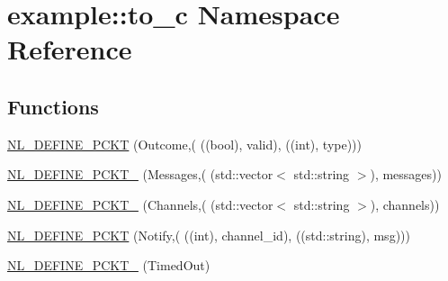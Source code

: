 \hypertarget{namespaceexample_1_1to__c}{}\section{example\+:\+:to\+\_\+c Namespace Reference}
\label{namespaceexample_1_1to__c}
\subsection*{Functions}
\begin{DoxyCompactItemize}
\item 
\hyperlink{namespaceexample_1_1to__c_ad5209fcbd7b509f14576e86ee3840db9}{N\+L\+\_\+\+D\+E\+F\+I\+N\+E\+\_\+\+P\+C\+K\+T} (Outcome,(                                                                                                                   
                                                                                                   ((bool), valid),                                                                                                   ((int), type)))
\item 
\hyperlink{namespaceexample_1_1to__c_af56932fb854bb06e55e6dc91fb9650f0}{N\+L\+\_\+\+D\+E\+F\+I\+N\+E\+\_\+\+P\+C\+K\+T\+\_} (Messages,(                                                                                                                                                                                                               
                                                                                                           (std\+::vector$<$ std\+::string $>$), messages))
\item 
\hyperlink{namespaceexample_1_1to__c_a66b812776e4a8cc18c60ca269cb761ec}{N\+L\+\_\+\+D\+E\+F\+I\+N\+E\+\_\+\+P\+C\+K\+T\+\_} (Channels,(                                                                                                                                                                                                               
                                                                                                           (std\+::vector$<$ std\+::string $>$), channels))
\item 
\hyperlink{namespaceexample_1_1to__c_a02e4be92664cfcf4a067fbd448d0f67f}{N\+L\+\_\+\+D\+E\+F\+I\+N\+E\+\_\+\+P\+C\+K\+T} (Notify,(                                                                                                                                       
                                                                                                   ((int), channel\+\_\+id),                                                                                                   ((std\+::string), msg)))
\item 
\hyperlink{namespaceexample_1_1to__c_aeeb0e7a1b2f8ac94e68e618340edd77d}{N\+L\+\_\+\+D\+E\+F\+I\+N\+E\+\_\+\+P\+C\+K\+T\+\_} (Timed\+Out)
\end{DoxyCompactItemize}
